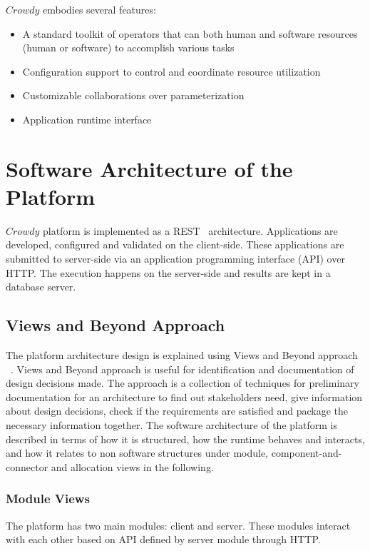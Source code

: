 $Crowdy$ embodies several features:
\begin{itemize}
	\item A standard toolkit of operators that can both human and software resources 
	(human or software) to accomplish various tasks
	\item Configuration support to control and coordinate resource utilization 
	\item Customizable collaborations over parameterization
	\item Application runtime interface
\end{itemize}

\section{Software Architecture of the Platform}
\label{sec:architecture}

$Crowdy$ platform is implemented as a REST~\cite{Richardson2008} architecture. 
Applications are developed, configured and validated on the client-side. These 
applications are submitted to server-side via an application programming interface 
(API) over HTTP. The execution happens on the server-side and results are kept 
in a database server.

\subsection{Views and Beyond Approach}
The platform architecture design is explained using Views and Beyond approach
~\cite{Clements}. Views and Beyond approach is useful for identification and documentation of 
design decisions made. The approach is a collection of techniques for preliminary 
documentation for an architecture to find out stakeholders need, give information about 
design decisions, check if the requirements are satisfied and package the necessary 
information together. The software architecture of the platform is described in terms of 
how it is structured, how the runtime behaves and interacts, and how it relates to 
non software structures under module, component-and-connector and allocation views 
in the following.

\subsubsection{Module Views}
The platform has two main modules: client and server. These modules interact with 
each other based on API defined by server module through HTTP.

